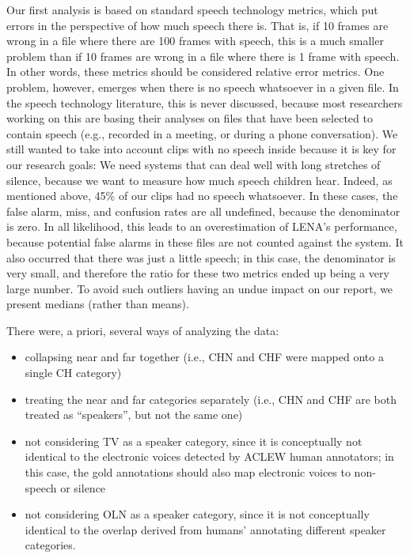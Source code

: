 \documentclass[english,floatsintext,man]{apa6}
\providecommand{\tightlist}{%
  \setlength{\itemsep}{0pt}\setlength{\parskip}{0pt}}
\begin{document}
Our first analysis is based on standard speech technology metrics, which
put errors in the perspective of how much speech there is. That is, if
10 frames are wrong in a file where there are 100 frames with speech,
this is a much smaller problem than if 10 frames are wrong in a file
where there is 1 frame with speech. In other words, these metrics should
be considered relative error metrics. One problem, however, emerges when
there is no speech whatsoever in a given file. In the speech technology
literature, this is never discussed, because most researchers working on
this are basing their analyses on files that have been selected to
contain speech (e.g., recorded in a meeting, or during a phone
conversation). We still wanted to take into account clips with no speech
inside because it is key for our research goals: We need systems that
can deal well with long stretches of silence, because we want to measure
how much speech children hear. Indeed, as mentioned above, 45\% of our
clips had no speech whatsoever. In these cases, the false alarm, miss,
and confusion rates are all undefined, because the denominator is zero.
In all likelihood, this leads to an overestimation of LENA's
performance, because potential false alarms in these files are not
counted against the system. It also occurred that there was just a
little speech; in this case, the denominator is very small, and
therefore the ratio for these two metrics ended up being a very large
number. To avoid such outliers having an undue impact on our report, we
present medians (rather than means).

There were, a priori, several ways of analyzing the data:

\begin{itemize}
\tightlist
\item
  collapsing near and far together (i.e., CHN and CHF were mapped onto a
  single CH category)
\item
  treating the near and far categories separately (i.e., CHN and CHF are
  both treated as \enquote{speakers}, but not the same one)
\item
  not considering TV as a speaker category, since it is conceptually not
  identical to the electronic voices detected by ACLEW human annotators;
  in this case, the gold annotations should also map electronic voices
  to non-speech or silence
\item
  not considering OLN as a speaker category, since it is not
  conceptually identical to the overlap derived from humans' annotating
  different speaker categories.
\end{itemize}
\end{document}
